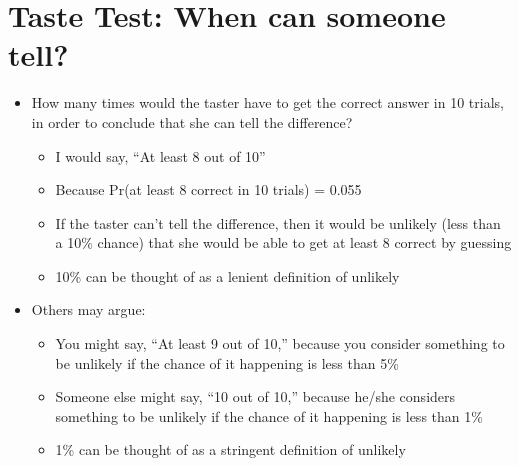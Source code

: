 \documentclass[12pt]{article}
\begin{document}
\section{Taste Test: When can someone
tell?}\label{taste-test-when-can-someone-tell}

\begin{itemize}
\itemsep1pt\parskip0pt
\item
  How many times would the taster have to get the correct answer in 10
  trials, in order to conclude that she can tell the difference?

  \begin{itemize}
  \itemsep1pt\parskip0pt
  \item
    I would say, ``At least 8 out of 10''
  \item
    Because Pr(at least 8 correct in 10 trials) = 0.055
  \item
    If the taster can't tell the difference, then it would be unlikely
    (less than a 10\% chance) that she would be able to get at least 8
    correct by guessing
  \item
    10\% can be thought of as a lenient definition of unlikely
  \end{itemize}
\item
  Others may argue:

  \begin{itemize}
  \itemsep1pt\parskip0pt
  \item
    You might say, ``At least 9 out of 10,'' because you consider
    something to be unlikely if the chance of it happening is less than
    5\%
  \item
    Someone else might say, ``10 out of 10,'' because he/she considers
    something to be unlikely if the chance of it happening is less than
    1\%
  \item
    1\% can be thought of as a stringent definition of unlikely
  \end{itemize}
\end{itemize}
\end{document}
